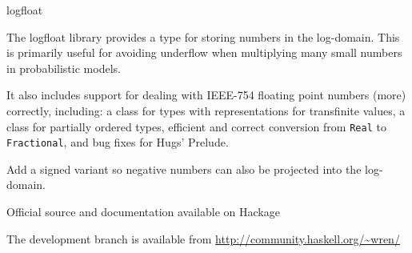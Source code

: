 \begin{hcarentry}{logfloat}
\makeheader

The logfloat library provides a type for storing numbers in the log-domain. This is primarily useful for avoiding underflow when multiplying many small numbers in probabilistic models.

It also includes support for dealing with IEEE-754 floating point numbers (more) correctly, including: a class for types with representations for transfinite values, a class for partially ordered types, efficient and correct conversion from \texttt{Real} to \texttt{Fractional}, and bug fixes for Hugs' Prelude.

\FuturePlans
Add a signed variant so negative numbers can also be projected into the log-domain.

\FurtherReading
\begin{compactitem}
\item Official source and documentation available on Hackage
\item The development branch is available from \url{http://community.haskell.org/~wren/}
\end{compactitem}
\end{hcarentry}
